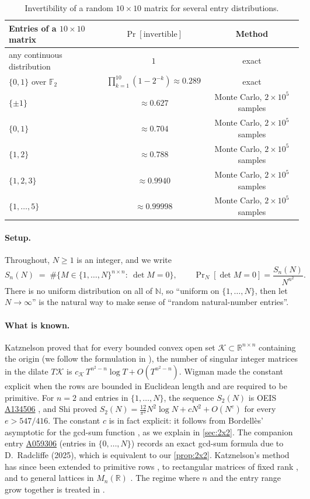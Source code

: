 \documentclass[11pt]{article}
\theoremstyle{definition}
\newcommand{\R}{\mathbb{R}}
\newcommand{\N}{\mathbb{N}}
\begin{document}
\begin{table}[htbp]
\centering
\begin{tabular}{@{}lcc@{}}
\toprule
Entries of a $10\times 10$ matrix & $\Pr[\text{invertible}]$ & Method \\
\midrule
any continuous distribution & $1$ & exact \\
$\{0,1\}$ over $\mathbb{F}_2$ & $\prod_{k=1}^{10}(1-2^{-k})\approx 0.289$ & exact \\
$\{\pm 1\}$ & $\approx 0.627$ & Monte Carlo, $2\times10^5$ samples \\
$\{0,1\}$ & $\approx 0.704$ & Monte Carlo, $2\times10^5$ samples \\
$\{1,2\}$ & $\approx 0.788$ & Monte Carlo, $2\times10^5$ samples \\
$\{1,2,3\}$ & $\approx 0.9940$ & Monte Carlo, $2\times10^5$ samples \\
$\{1,\dots,5\}$ & $\approx 0.99998$ & Monte Carlo, $2\times10^5$ samples \\
\bottomrule
\end{tabular}
\caption{Invertibility of a random $10\times 10$ matrix for several entry distributions.}
\label{tab:mc}
\end{table}

\paragraph{Setup.} Throughout, $N\ge 1$ is an integer, and we write
\[
S_n(N)\;=\;\#\bigl\{M\in\{1,\dots,N\}^{n\times n}:\ \det M=0\bigr\},
\qquad
\Pr\nolimits_N[\det M=0]=\frac{S_n(N)}{N^{n^2}}.
\]
There is no uniform distribution on all of $\N$, so ``uniform on $\{1,\dots,N\}$, then let $N\to\infty$'' is the natural way to make sense of ``random natural-number entries''.

\paragraph{What is known.} Katznelson \cite[Thm.~1]{Katznelson} proved that for every bounded convex open set $\mathcal{K}\subset\R^{n\times n}$ containing the origin (we follow the formulation in \cite{AO}), the number of singular integer matrices in the dilate $T\mathcal{K}$ is $c_{\mathcal K}\,T^{n^2-n}\log T+O(T^{n^2-n})$. Wigman \cite{Wigman} made the constant explicit when the rows are bounded in Euclidean length and are required to be primitive. For $n=2$ and entries in $\{1,\dots,N\}$, the sequence $S_2(N)$ is OEIS \href{https://oeis.org/A134506}{A134506} \cite{OEIS}, and Shi \cite{Shi} proved $S_2(N)=\frac{12}{\pi^2}N^2\log N+cN^2+O(N^{e})$ for every $e>547/416$. The constant $c$ is in fact explicit: it follows from Bordellès' asymptotic for the gcd-sum function \cite{Bordelles}, as we explain in \cref{sec:2x2}. The companion entry \href{https://oeis.org/A059306}{A059306} (entries in $\{0,\dots,N\}$) records an exact gcd-sum formula due to D.~Radcliffe (2025), which is equivalent to our \cref{prop:2x2}. Katznelson's method has since been extended to primitive rows \cite{Wigman}, to rectangular matrices of fixed rank \cite{Katznelson94,GSVV}, and to general lattices in $M_n(\R)$ \cite{KimOh}. The regime where $n$ and the entry range grow together is treated in \cite{KaringulaLovett}.
\end{document}
